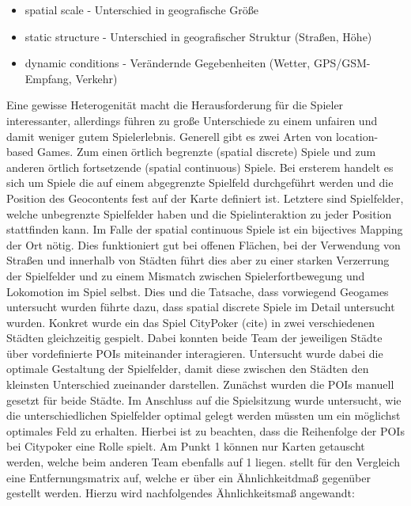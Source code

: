 \begin{itemize}
      \item spatial scale - Unterschied in geografische Größe
      \item static structure - Unterschied in geografischer Struktur (Straßen, Höhe) 
      \item dynamic conditions - Verändernde Gegebenheiten (Wetter, GPS/GSM-Empfang, Verkehr)
\end{itemize}

Eine gewisse Heterogenität macht die Herausforderung für die Spieler interessanter, allerdings führen zu große Unterschiede zu einem unfairen und damit weniger gutem Spielerlebnis.
Generell gibt es zwei Arten von location-based Games. Zum einen örtlich begrenzte (spatial discrete) Spiele und zum anderen örtlich fortsetzende (spatial
continuous) Spiele.
Bei ersterem handelt es sich um Spiele die auf einem abgegrenzte Spielfeld durchgeführt werden und die Position des Geocontents fest auf der Karte definiert ist. Letztere sind Spielfelder, welche unbegrenzte Spielfelder haben und die Spielinteraktion zu jeder Position stattfinden kann.
Im Falle der spatial continuous Spiele ist ein bijectives Mapping der Ort nötig. Dies funktioniert gut bei offenen Flächen, bei der Verwendung von Straßen und innerhalb von Städten führt dies aber zu einer starken Verzerrung der Spielfelder und zu einem Mismatch zwischen Spielerfortbewegung und Lokomotion im Spiel selbst.
Dies und die Tatsache, dass vorwiegend Geogames untersucht wurden führte dazu, dass  spatial discrete Spiele im Detail untersucht wurden.
Konkret wurde ein das Spiel CityPoker (cite) in zwei verschiedenen Städten gleichzeitig gespielt. Dabei konnten beide Team der jeweiligen Städte über vordefinierte POIs miteinander interagieren. Untersucht wurde dabei die optimale Gestaltung der Spielfelder, damit diese zwischen den Städten den kleinsten Unterschied zueinander darstellen. Zunächst wurden die POIs manuell gesetzt für beide Städte. Im Anschluss auf die Spielsitzung wurde untersucht, wie die unterschiedlichen Spielfelder optimal gelegt werden müssten um ein möglichst optimales Feld zu erhalten. Hierbei ist zu beachten, dass die Reihenfolge der POIs bei Citypoker eine Rolle spielt. Am Punkt 1 können nur Karten getauscht werden, welche beim anderen Team ebenfalls auf 1 liegen.  \cite{PeterKiefer.2007} stellt für den Vergleich eine Entfernungsmatrix auf, welche er über ein Ähnlichkeitdmaß gegenüber gestellt werden.
Hierzu wird nachfolgendes Ähnlichkeitsmaß angewandt:

